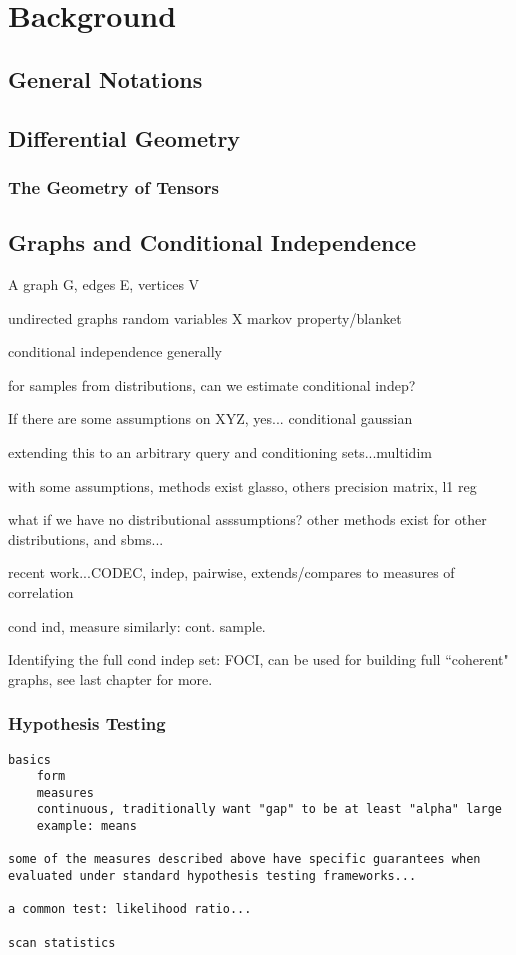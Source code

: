 \chapter{Background}\label{sec:bknd}

\section{General Notations}



\section{Differential Geometry}

\subsection{The Geometry of Tensors}


\section{Graphs and Conditional Independence}

A graph G, edges E, vertices V

undirected graphs
random variables X
markov property/blanket

conditional independence generally

for samples from distributions, can we estimate conditional indep?

If there are some assumptions on XYZ, yes...
conditional gaussian

extending this to an arbitrary query and conditioning sets...multidim

with some assumptions, methods exist
glasso, others
precision matrix, l1 reg

what if we have no distributional asssumptions?
other methods exist for other distributions, and sbms...

recent work...CODEC, 
indep, pairwise, extends/compares to measures of correlation

cond ind, measure similarly:
cont.
sample.

Identifying the full cond indep set: FOCI, 
can be used for building full ``coherent" graphs, see last chapter for more.

\subsection{Hypothesis Testing}
\begin{verbatim}
basics
    form
    measures
    continuous, traditionally want "gap" to be at least "alpha" large
    example: means

some of the measures described above have specific guarantees when evaluated under standard hypothesis testing frameworks...

a common test: likelihood ratio...

scan statistics
\end{verbatim}

